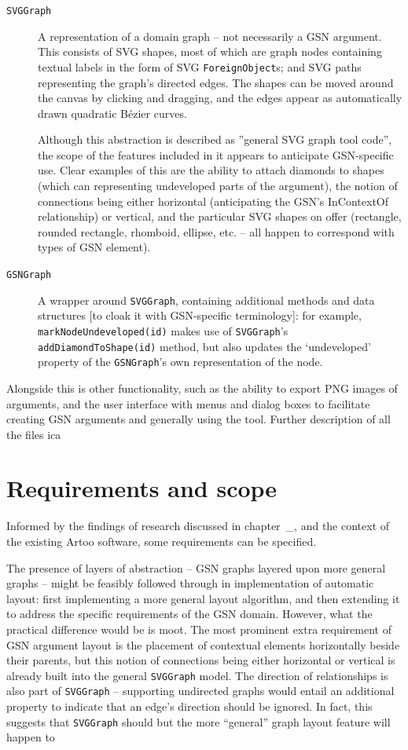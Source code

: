 \begin{description}

\item[{\tt SVGGraph}] A representation of a domain graph -- not necessarily a GSN argument.
This consists of SVG shapes, most of which are graph nodes containing textual labels in the form of SVG {\tt ForeignObject}s; and SVG paths representing the graph's directed edges.
The shapes can be moved around the canvas by clicking and dragging, and the edges appear as automatically drawn quadratic B\'{e}zier curves. 

Although this abstraction is described as ''general SVG graph tool code'', the scope of the features included in it appears to anticipate GSN-specific use. Clear examples of this are the ability to attach diamonds to shapes (which can representing undeveloped parts of the argument), the notion of connections being either horizontal (anticipating the GSN's InContextOf relationship) or vertical, and the particular SVG shapes on offer (rectangle, rounded rectangle, rhomboid, ellipse, etc. -- all happen to correspond with types of GSN element).

\item[{\tt GSNGraph}] A wrapper around {\tt SVGGraph}, containing additional methods and data structures [to cloak it with GSN-specific terminology]: for example, {\tt markNodeUndeveloped(id)} makes use of {\tt SVGGraph}'s {\tt addDiamondToShape(id)} method, but also updates the `undeveloped' property of the {\tt GSNGraph}'s own representation of the node.

\end{description}
  
Alongside this is other functionality, such as the ability to export PNG images of arguments, and the user interface with menus and dialog boxes to facilitate creating GSN arguments and generally using the tool. Further description of all the files ica


\section{Requirements and scope}

Informed by the findings of research discussed in chapter~\_, and the context of the existing Artoo software, some requirements can be specified.

The presence of layers of abstraction -- GSN graphs layered upon more general graphs -- might be feasibly followed through in implementation of automatic layout: first implementing a more general layout algorithm, and then  extending it to address the specific requirements of the GSN domain. However, what the practical difference would be is moot. The most prominent extra requirement of GSN argument layout is the placement of contextual elements horizontally beside their parents, but this notion of connections being either horizontal or vertical is already built into the general {\tt SVGGraph} model. The direction of relationships is also part of {\tt SVGGraph} -- supporting undirected graphs would entail an additional property to indicate that an edge's direction should be ignored. In fact, this suggests that {\tt SVGGraph} should but the more ``general'' graph layout feature will happen to 


